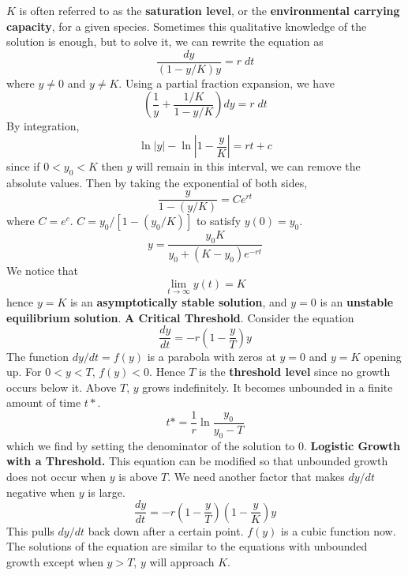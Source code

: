     $K$ is often referred to as the \textbf{saturation level}, or the \textbf{environmental carrying capacity}, for a given species.
    \newline \indent
    Sometimes this qualitative knowledge of the solution is enough, but to solve it, we can rewrite the equation as
    \begin{equation*}
        \frac{dy}{(1 - y/K)y} = r \; dt
    \end{equation*}
    where $y \neq 0$ and $y \neq K$. Using a partial fraction expansion, we have
    \begin{equation*}
        (\frac{1}{y} + \frac{1/K}{1-y/K})dy = r \; dt
    \end{equation*}
    By integration,
    \begin{equation*}
        \ln |y| - \ln |1 - \frac{y}{K}| = rt + c
    \end{equation*}
    since if $0 < y_0 < K$ then $y$ will remain in this interval, we can remove the absolute values. Then by taking the exponential of both sides,
    \begin{equation*}
        \frac{y}{1-(y/K)} = Ce^{rt}
    \end{equation*}
    where $C = e^c$. $C = y_0/[1-(y_0/K)]$ to satisfy $y(0) = y_0$.
    \begin{equation*}
        y = \frac{y_0K}{y_0 + (K - y_0)e^{-rt}}
    \end{equation*}
    We notice that 
    \begin{equation*}
        \lim_{t \rightarrow \infty} y(t) = K
    \end{equation*}
    hence $y = K$ is an \textbf{asymptotically stable solution}, and $y = 0$ is an \textbf{unstable equilibrium solution}.
    \newline
    \textbf{A Critical Threshold}. Consider the equation
    \begin{equation*}
        \frac{dy}{dt} = -r(1 - \frac{y}{T})y
    \end{equation*}
    The function $dy/dt = f(y)$ is a parabola with zeros at $y = 0$ and $y = K$ opening up. For $0 < y < T$, $f(y) < 0$. Hence $T$ is the \textbf{threshold level} since no growth occurs below it. Above $T$, $y$ grows indefinitely. It becomes unbounded in a finite amount of time $t*$.
    \begin{equation*}
        t* = \frac{1}{r}\ln\frac{y_0}{y_0 - T}
    \end{equation*}
    which we find by setting the denominator of the solution to 0.
    \newline
    \textbf{Logistic Growth with a Threshold.} This equation can be modified so that unbounded growth does not occur when $y$ is above $T$. We need another factor that makes $dy/dt$ negative when $y$ is large.
    \begin{equation*}
        \frac{dy}{dt} = -r(1 - \frac{y}{T})(1 - \frac{y}{K})y
    \end{equation*}
    This pulls $dy/dt$ back down after a certain point. $f(y)$ is a cubic function now. The solutions of the equation are similar to the equations with unbounded growth except when $y > T$, $y$ will approach $K$.
